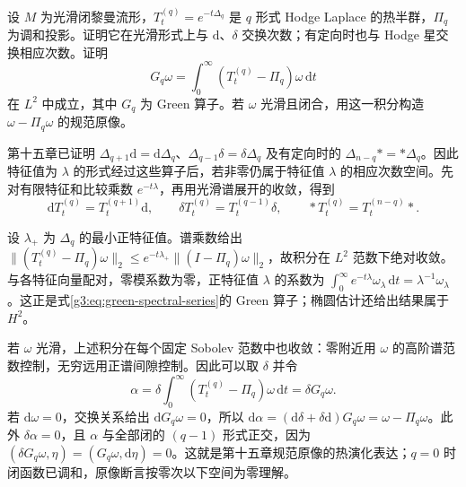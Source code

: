 \begin{exercise}\label{g3:ex:hodge-heat-green-integral}
	设 \(M\) 为光滑闭黎曼流形，\(T_t^{(q)}=e^{-t\Delta_q}\) 是 \(q\) 形式 Hodge Laplace 的热半群，\(\Pi_q\) 为调和投影。证明它在光滑形式上与 \(\mathrm d\)、\(\delta\) 交换次数；有定向时也与 Hodge 星交换相应次数。证明
	\[
		G_q\omega=\int_0^\infty(T_t^{(q)}-\Pi_q)\omega\,\mathrm dt
	\]
	在 \(L^2\) 中成立，其中 \(G_q\) 为 Green 算子。若 \(\omega\) 光滑且闭合，用这一积分构造 \(\omega-\Pi_q\omega\) 的规范原像。
\end{exercise}
\begin{solution}
	第十五章已证明 \(\Delta_{q+1}\mathrm d=\mathrm d\Delta_q\)、\(\Delta_{q-1}\delta=\delta\Delta_q\) 及有定向时的 \(\Delta_{n-q}*=*\Delta_q\)。因此特征值为 \(\lambda\) 的形式经过这些算子后，若非零仍属于特征值 \(\lambda\) 的相应次数空间。先对有限特征和比较乘数 \(e^{-t\lambda}\)，再用光滑谱展开的收敛，得到
	\[
		\mathrm dT_t^{(q)}=T_t^{(q+1)}\mathrm d,\qquad
		\delta T_t^{(q)}=T_t^{(q-1)}\delta,\qquad
		*T_t^{(q)}=T_t^{(n-q)}*.
	\]

	设 \(\lambda_+\) 为 \(\Delta_q\) 的最小正特征值。谱乘数给出
	\(\|(T_t^{(q)}-\Pi_q)\omega\|_2\le e^{-t\lambda_+}\|(I-\Pi_q)\omega\|_2\)，故积分在 \(L^2\) 范数下绝对收敛。与各特征向量配对，零模系数为零，正特征值 \(\lambda\) 的系数为 \(\int_0^\infty e^{-t\lambda}\omega_\lambda\,\mathrm dt=\lambda^{-1}\omega_\lambda\)。这正是式\eqref{g3:eq:green-spectral-series}的 Green 算子；椭圆估计还给出结果属于 \(H^2\)。

	若 \(\omega\) 光滑，上述积分在每个固定 Sobolev 范数中也收敛：零附近用 \(\omega\) 的高阶谱范数控制，无穷远用正谱间隙控制。因此可以取 \(\delta\) 并令
	\[
		\alpha=\delta\int_0^\infty(T_t^{(q)}-\Pi_q)\omega\,\mathrm dt
		=\delta G_q\omega.
	\]
	若 \(\mathrm d\omega=0\)，交换关系给出 \(\mathrm dG_q\omega=0\)，所以
	\(\mathrm d\alpha=(\mathrm d\delta+\delta\mathrm d)G_q\omega=\omega-\Pi_q\omega\)。此外 \(\delta\alpha=0\)，且 \(\alpha\) 与全部闭的 \((q-1)\) 形式正交，因为 \((\delta G_q\omega,\eta)=(G_q\omega,\mathrm d\eta)=0\)。这就是第十五章规范原像的热演化表达；\(q=0\) 时闭函数已调和，原像断言按零次以下空间为零理解。
\end{solution}

